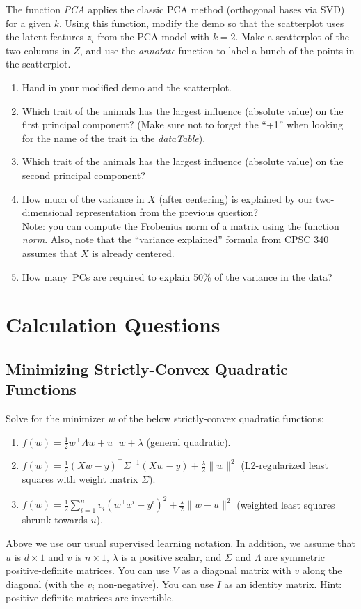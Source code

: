 \documentclass{article}
\def\blu#1{{\color{blu}#1}}
\def\norm#1{\|#1\|}
\def\half{\frac 1 2}
\def\enum#1{\begin{enumerate}#1\end{enumerate}}
\begin{document}
The function \emph{PCA} applies the classic PCA method (orthogonal bases via SVD) for a given $k$. Using this function, modify the demo so that the scatterplot uses the latent features $z_i$ from the PCA model with $k=2$. Make a scatterplot of the two columns in $Z$, and use the \emph{annotate} function to label a bunch of the points in the scatterplot.
\enum{
\item  \blu{Hand in your modified demo and the scatterplot.}
\item \blu{Which trait of the animals has the largest influence (absolute value) on the first principal component?} (Make sure not to forget the ``+1'' when looking for the name of the trait in the \emph{dataTable}).
\item \blu{Which trait of the animals has the largest influence (absolute value) on the second principal component?}
\item \blu{How much of the variance in $X$ (after centering) is explained by our two-dimensional representation from the previous question?}\\
Note: you can compute the Frobenius norm of a matrix using the function \emph{norm}. Also, note that the ``variance explained'' formula from CPSC 340 assumes that $X$ is already centered.
\item \blu{How many\ PCs are required to explain 50\% of the variance in the data?}
}


\section{Calculation Questions}






\subsection{Minimizing Strictly-Convex Quadratic Functions}

Solve for the minimizer $w$ of the below strictly-convex quadratic functions:
\blu{\enum{
\item $f(w) = \frac{1}{2}w^\top \Lambda w + u^\top w + \lambda$ (general quadratic).
\item $f(w)= \half (Xw - y)^\top\Sigma^{-1}(Xw-y) + \frac \lambda 2 \norm{w}^2$ (L2-regularized least squares with weight matrix $\Sigma$).
\item $f(w) = \frac{1}{2}\sum_{i=1}^n v_i(w^\top x^i - y^i)^2 + \frac{\lambda}{2}\norm{w-u}^2$ (weighted least squares shrunk towards $u$).
}}
Above we use our usual supervised learning notation. In addition, we assume that $u$ is $d \times 1$ and $v$ is $n \times 1$, $\lambda$ is a positive scalar, and $\Sigma$ and $\Lambda$ are symmetric positive-definite matrices. You can use $V$ as a diagonal matrix with $v$ along the diagonal (with the $v_i$ non-negative). You can use $I$ as an identity matrix. Hint: positive-definite matrices are invertible.
\end{document}
